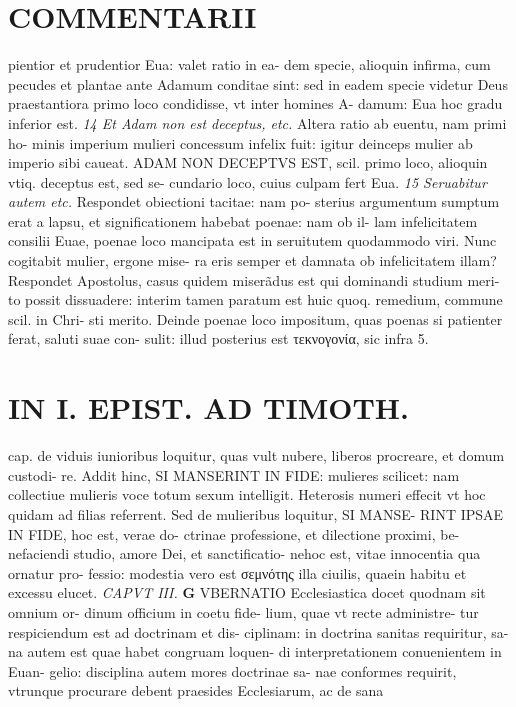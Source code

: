 \documentclass{article}
\begin{document}
\begin{pages}
\section*{COMMENTARII }
\marginpar{[ p.58 ]}\pstart pientior et prudentior Eua: valet ratio in ea- dem specie, alioquin infirma, cum pecudes et plantae ante Adamum conditae sint: sed in eadem specie videtur Deus praestantiora primo loco condidisse, vt inter homines A- damum: Eua hoc gradu inferior est.  \pend
\textit{14 Et Adam non est deceptus, etc. }\pstart Altera ratio ab euentu, nam primi ho- minis imperium mulieri concessum infelix fuit: igitur deinceps mulier ab imperio sibi caueat. ADAM NON DECEPTVS EST, scil. primo loco, alioquin vtiq. deceptus est, sed se- cundario loco, cuius culpam fert Eua.  \pend
\textit{15 Seruabitur autem etc. }\pstart Respondet obiectioni tacitae: nam po- sterius argumentum sumptum erat a lapsu, et significationem habebat poenae: nam ob il- lam infelicitatem consilii Euae, poenae loco mancipata est in seruitutem quodammodo viri. Nunc cogitabit mulier, ergone mise- ra eris semper et damnata ob infelicitatem illam? Respondet Apostolus, casus quidem miserãdus est qui dominandi studium meri- to possit dissuadere: interim tamen paratum est huic quoq. remedium, commune scil. in Chri- sti merito. Deinde poenae loco impositum, quas poenas si patienter ferat, saluti suae con- sulit: illud posterius est τεκνογονία, sic infra 5.  \pend
\section*{IN I. EPIST. AD TIMOTH. }
\marginpar{[ p.59 ]}\pstart cap. de viduis iunioribus loquitur, quas vult nubere, liberos procreare, et domum custodi- re. Addit hinc, SI MANSERINT IN FIDE: mulieres scilicet: nam collectiue mulieris voce totum sexum intelligit. Heterosis numeri effecit vt hoc quidam ad filias referrent. Sed de mulieribus loquitur, SI MANSE- RINT IPSAE IN FIDE, hoc est, verae do- ctrinae professione, et dilectione proximi, be- nefaciendi studio, amore Dei, et sanctificatio- nehoc est, vitae innocentia qua ornatur pro- fessio: modestia vero est σεμνότης illa ciuilis, quaein habitu et excessu elucet.  \pend
\textit{CAPVT III. }
\textbf{G }\pstart VBERNATIO Ecclesiastica docet quodnam sit omnium or- dinum officium in coetu fide- lium, quae vt recte administre- tur respiciendum est ad doctrinam et dis- ciplinam: in doctrina sanitas requiritur, sa- na autem est quae habet congruam loquen- di interpretationem conuenientem in Euan- gelio: disciplina autem mores doctrinae sa- nae conformes requirit, vtrunque procurare debent praesides Ecclesiarum, ac de sana  \pend

\end{pages}
\end{document}
